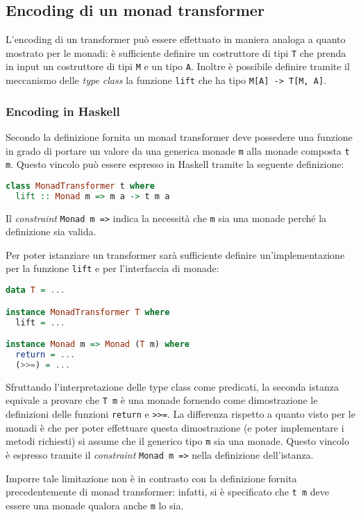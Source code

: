 \subsection{Encoding di un monad transformer}
L'encoding di un transformer può essere effettuato in maniera analoga a quanto mostrato per le monadi: è sufficiente definire un costruttore di tipi \lstinline{T} che prenda in input un costruttore di tipi \lstinline{M} e un tipo \lstinline{A}. Inoltre è possibile definire tramite il meccanismo delle \emph{type class} la funzione \lstinline{lift} che ha tipo \lstinline{M[A] -> T[M, A]}.

\subsubsection{Encoding in Haskell}
Secondo la definizione fornita un monad transformer deve possedere una funzione in grado di portare un valore da una generica monade \lstinline{m} alla monade composta \lstinline{t m}. Questo vincolo può essere espresso in Haskell tramite la seguente definizione:
\begin{lstlisting}[language=haskell]
class MonadTransformer t where
  lift :: Monad m => m a -> t m a
\end{lstlisting}
Il \emph{constraint} \lstinline{Monad m =>} indica la necessità che \lstinline{m} sia una monade perché la definizione sia valida.

Per poter istanziare un transformer sarà sufficiente definire un'implementazione per la funzione \lstinline{lift} e per l'interfaccia di monade:
\begin{lstlisting}[language=haskell]
data T = ...

instance MonadTransformer T where
  lift = ...

instance Monad m => Monad (T m) where
  return = ...
  (>>=) = ...
\end{lstlisting}
Sfruttando l'interpretazione delle type class come predicati, la seconda istanza equivale a provare che \lstinline{T m} è una monade fornendo come dimostrazione le definizioni delle funzioni \lstinline{return} e \lstinline{>>=}. La differenza rispetto a quanto visto per le monadi è che per poter effettuare questa dimostrazione (e poter implementare i metodi richiesti) si assume che il generico tipo \lstinline{m} sia una monade. Questo vincolo è espresso tramite il \emph{constraint} \lstinline{Monad m =>} nella definizione dell'istanza.

Imporre tale limitazione non è in contrasto con la definizione fornita precedentemente di monad transformer: infatti, si è specificato che \lstinline{t m} deve essere una monade qualora anche \lstinline{m} lo sia.

